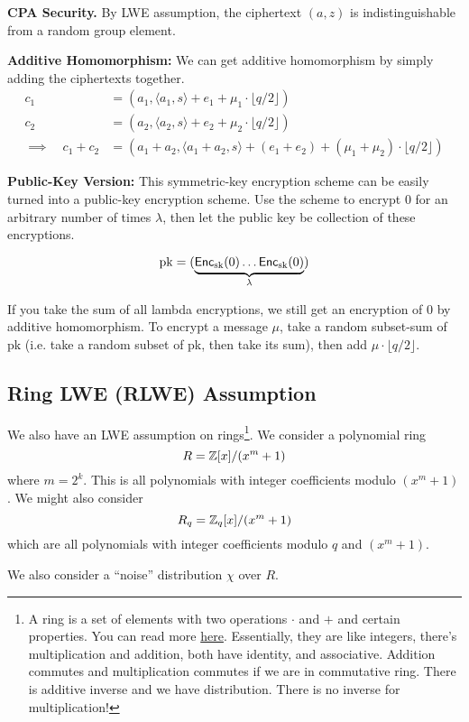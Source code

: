 \textbf{CPA Security.} By LWE assumption, the ciphertext $(a, z)$ is indistinguishable from a random group element.

\textbf{Additive Homomorphism:} We can get additive homomorphism by simply adding the ciphertexts together.
\begin{align*}
    c_1 &= (a_1, \langle a_1, s\rangle + e_1 + \mu_1 \cdot \lfloor q/2 \rfloor)\\
    c_2 &= (a_2, \langle a_2, s \rangle + e_2 + \mu_2 \cdot \lfloor q/2 \rfloor)\\
    \implies \quad c_1 + c_2 &= (a_1 + a_2, \langle a_1 + a_2, s \rangle + (e_1 + e_2) + (\mu_1 + \mu_2) \cdot \lfloor q/2 \rfloor)
\end{align*}

\textbf{Public-Key Version:} This symmetric-key encryption scheme can be easily turned into a public-key encryption scheme. Use the scheme to encrypt 0 for an arbitrary number of times $\lambda$, then let the public key be collection of these encryptions.

$$\mathrm{pk} = (\underbrace{\operatorname{\mathsf{Enc}}_{\mathrm{sk}}(0) \dots \operatorname{\mathsf{Enc}}_{\mathrm{sk}}(0)}_{\lambda})$$

If you take the sum of all lambda encryptions, we still get an encryption of 0 by additive homomorphism. To encrypt a message $\mu$, take a random subset-sum of pk (i.e. take a random subset of pk, then take its sum), then add $\mu \cdot \lfloor q/ 2 \rfloor $.

\subsection{Ring LWE (RLWE) Assumption}
We also have an LWE assumption on rings\footnote{A ring is a set of elements with two operations $\cdot$ and $+$ and certain properties. You can read more \href{https://en.wikipedia.org/wiki/Ring_(mathematics)}{here}. Essentially, they are like integers, there's multiplication and addition, both have identity, and associative. Addition commutes and multiplication commutes if we are in commutative ring. There is additive inverse and we have distribution. There is no inverse for multiplication!}. We consider a polynomial ring
\[R = \mathbb Z[x]/(x^m + 1)\]
where $m = 2^k$. This is all polynomials with integer coefficients modulo $(x^m + 1)$. We might also consider
\[R_q = \mathbb Z_q[x] / (x^m + 1)\]
which are all polynomials with integer coefficients modulo $q$ and $(x^m + 1)$.

We also consider a ``noise'' distribution $\chi$ over $R$.

